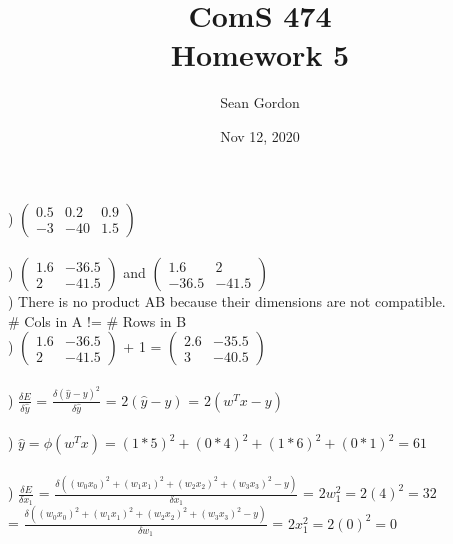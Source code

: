 \documentclass[12pt]{article}
\title{ComS 474\\Homework 5}
\author{Sean Gordon}
\date{Nov 12, 2020}
\begin{document}
\maketitle



) $
\begin{pmatrix}
0.5 & 0.2 & 0.9\\
-3 & -40 & 1.5
\end{pmatrix}$\\\\

) $
\begin{pmatrix}
1.6 & -36.5\\
2 & -41.5
\end{pmatrix}$
 and $
\begin{pmatrix}
1.6 & 2\\
-36.5 & -41.5
\end{pmatrix}$\\[.4em]

) There is no product AB because their dimensions are not compatible. \\
\indent \# Cols in A != \# Rows in B\\

) $\begin{pmatrix}
1.6 & -36.5\\
2 & -41.5
\end{pmatrix}$ + 1 = $
\begin{pmatrix}
2.6 & -35.5\\
3 & -40.5
\end{pmatrix}$\\\\

) {\Large $\frac{\delta E}{\delta \hat y}$} = {\Large $\frac{\delta (\hat y - y)^2}{\delta \hat y}$} = $2(\hat y - y)$ = $2(w^Tx - y)$\\\\

) $\hat y = \phi(w^Tx) = (1*5)^2+(0*4)^2+(1*6)^2+(0*1)^2 = 61$\\\\

) {\Large $\frac{\delta E}{\delta x_1}$} = {\Large $\frac{\delta ((w_0x_0)^2 + (w_1x_1)^2 + (w_2x_2)^2 + (w_3x_3)^2 - y)}{\delta x_1}$} = $2w_1^2 = 2(4)^2 = 32$\\[.4em]
 = {\Large $\frac{\delta ((w_0x_0)^2 + (w_1x_1)^2 + (w_2x_2)^2 + (w_3x_3)^2 - y)}{\delta w_1}$} = $2x_1^2 = 2(0)^2 = 0$\\\\
\end{document}
